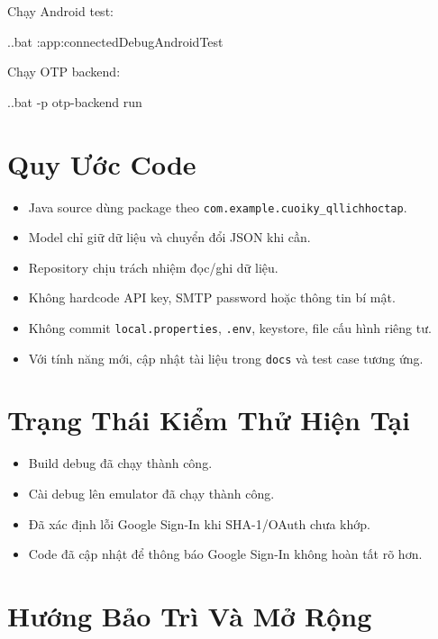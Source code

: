 \documentclass[12pt,a4paper]{report}
\begin{document}
Chạy Android test:

\begin{CodeBlock}
.\gradlew.bat :app:connectedDebugAndroidTest
\end{CodeBlock}

Chạy OTP backend:

\begin{CodeBlock}
.\gradlew.bat -p otp-backend run
\end{CodeBlock}

\section{Quy Ước Code}

\begin{itemize}
\item Java source dùng package theo \texttt{com.example.cuoiky\_qllichhoctap}.
\item Model chỉ giữ dữ liệu và chuyển đổi JSON khi cần.
\item Repository chịu trách nhiệm đọc/ghi dữ liệu.
\item Không hardcode API key, SMTP password hoặc thông tin bí mật.
\item Không commit \texttt{local.properties}, \texttt{.env}, keystore, file cấu hình riêng tư.
\item Với tính năng mới, cập nhật tài liệu trong \texttt{docs} và test case tương ứng.
\end{itemize}

\section{Trạng Thái Kiểm Thử Hiện Tại}

\begin{itemize}
\item Build debug đã chạy thành công.
\item Cài debug lên emulator đã chạy thành công.
\item Đã xác định lỗi Google Sign-In khi SHA-1/OAuth chưa khớp.
\item Code đã cập nhật để thông báo Google Sign-In không hoàn tất rõ hơn.
\end{itemize}

\section{Hướng Bảo Trì Và Mở Rộng}
\end{document}
